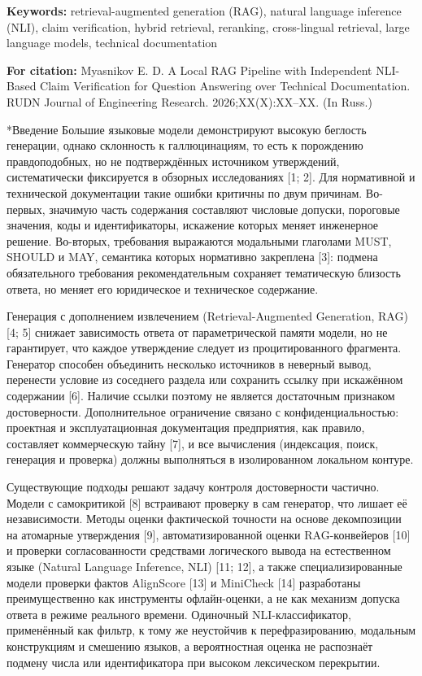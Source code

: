 \documentclass[14pt,a4paper]{extarticle}
\makeatletter
\renewcommand\section{\@startsection{section}{1}{\z@}{12pt plus 2pt}{6pt}{\normalfont\normalsize\bfseries\raggedright}}
\makeatother
\begin{document}
\begin{singlespace*}
\begin{otherlanguage}{english}
\textbf{Keywords:} retrieval-augmented generation (RAG), natural language inference (NLI), claim verification, hybrid retrieval, reranking, cross-lingual retrieval, large language models, technical documentation

\textbf{For citation:} Myasnikov E. D. A Local RAG Pipeline with Independent NLI-Based Claim Verification for Question Answering over Technical Documentation. RUDN Journal of Engineering Research. 2026;XX(X):XX–XX. (In Russ.)
\end{otherlanguage}
\end{singlespace*}

\section*{Введение}
Большие языковые модели демонстрируют высокую беглость генерации, однако склонность к галлюцинациям, то есть к порождению правдоподобных, но не подтверждённых источником утверждений, систематически фиксируется в обзорных исследованиях [1; 2]. Для нормативной и технической документации такие ошибки критичны по двум причинам. Во-первых, значимую часть содержания составляют числовые допуски, пороговые значения, коды и идентификаторы, искажение которых меняет инженерное решение. Во-вторых, требования выражаются модальными глаголами MUST, SHOULD и MAY, семантика которых нормативно закреплена [3]: подмена обязательного требования рекомендательным сохраняет тематическую близость ответа, но меняет его юридическое и техническое содержание.

Генерация с дополнением извлечением (Retrieval-Augmented Generation, RAG) [4; 5] снижает зависимость ответа от параметрической памяти модели, но не гарантирует, что каждое утверждение следует из процитированного фрагмента. Генератор способен объединить несколько источников в неверный вывод, перенести условие из соседнего раздела или сохранить ссылку при искажённом содержании [6]. Наличие ссылки поэтому не является достаточным признаком достоверности. Дополнительное ограничение связано с конфиденциальностью: проектная и эксплуатационная документация предприятия, как правило, составляет коммерческую тайну [7], и все вычисления (индексация, поиск, генерация и проверка) должны выполняться в изолированном локальном контуре.

Существующие подходы решают задачу контроля достоверности частично. Модели с самокритикой [8] встраивают проверку в сам генератор, что лишает её независимости. Методы оценки фактической точности на основе декомпозиции на атомарные утверждения [9], автоматизированной оценки RAG-конвейеров [10] и проверки согласованности средствами логического вывода на естественном языке (Natural Language Inference, NLI) [11; 12], а также специализированные модели проверки фактов AlignScore [13] и MiniCheck [14] разработаны преимущественно как инструменты офлайн-оценки, а не как механизм допуска ответа в режиме реального времени. Одиночный NLI-классификатор, применённый как фильтр, к тому же неустойчив к перефразированию, модальным конструкциям и смешению языков, а вероятностная оценка не распознаёт подмену числа или идентификатора при высоком лексическом перекрытии.
\end{document}
